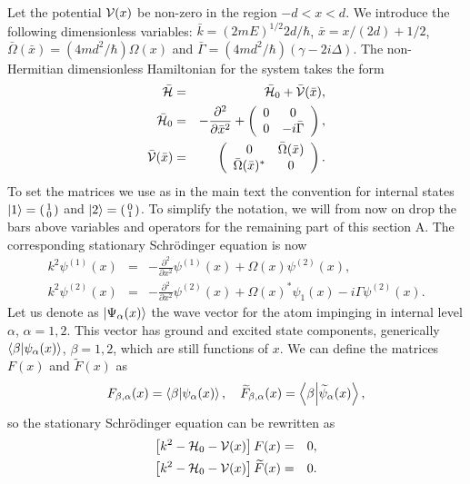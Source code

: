 %
Let the potential ${\cal V}(x)$ be non-zero in the region $-d < x < d$.
We  introduce the following dimensionless variables: $\bar k = (2mE)^{1/2}2d/\hbar$, $\bar x = x/(2d) + 1/2$,
$\bar\Omega (\bar x)= (4md^2/\hbar) \Omega(x)$ and $\bar\Gamma = (4md^2/\hbar) (\gamma-2i\Delta)$.
%
%
The non-Hermitian dimensionless Hamiltonian for the system takes the form
%
\begin{eqnarray}
	\bar {\cal H}&=& \bar {\cal H}_{0}+\bar {\cal V}(\bar x), \\
	\bar {\cal H}_{0}&=&- \frac{\partial^2 }{\partial {\bar x}^2}+\left(\begin{array}{cc}
	0 & 0 \\
	0 & -i\bar\Gamma
	\end{array}\right), \\
	\bar {\cal V}(\bar x)&=& \left(\begin{array}{cc}
	0 & \bar\Omega (\bar x)\\
	\bar\Omega (\bar x)^{*} & 0
	\end{array}\right).
\end{eqnarray}
%
To set the matrices we use as in the main text the convention for internal states $\ket{1} = \left(\begin{smallmatrix}1\\0\end{smallmatrix}\right)$ and $\ket{2} = \left(\begin{smallmatrix}0\\1\end{smallmatrix}\right)$.
%
To simplify the notation, we will from now on drop the bars above variables and operators for the remaining part of this section A.
The corresponding stationary Schr\"odinger equation is now
%
\begin{eqnarray}
	k^{2} \psi^{(1)}(x)&=&-\frac{\partial^2}{\partial x^2}\psi^{(1)}(x)+\Omega(x) \psi^{(2)}(x),
	\nonumber \\
	k^{2} \psi^{(2)}(x)&=&-\frac{\partial^2}{\partial x^2}\psi^{(2)}(x)+\Omega(x)^* \psi_{1}(x)-i \Gamma \psi^{(2)}(x).
	\nonumber
\end{eqnarray}
%
Let us denote as  $|{\Psi}_\alpha(x)\rangle$  the wave vector for the atom impinging in internal level $\alpha$, $\alpha=1,2$.
This vector has ground and excited state components, generically $\braket{\beta}{\psi_{\alpha}(x)}$, $\beta=1,2$, which are still functions of $x$.
We can define the matrices $F(x)$ and $\widetilde{F}(x)$ as
%
\begin{eqnarray}
	F_{\beta,\alpha} (x) = \braket{\beta}{\psi_{\alpha}(x)},
	\quad
	\widetilde{F}_{\beta,\alpha} (x) = \braket{\beta}{\widetilde{\psi}_{\alpha}(x)},
\end{eqnarray}
%
so the stationary Schr\"odinger equation can be rewritten as
%
\begin{eqnarray}
	\left[k^2-{\cal H}_{0}-{\cal V}(x)\right]F(x)&=&0,
	\nonumber\\
	\left[k^2-{\cal H}_{0}-{\cal V}(x)\right]\widetilde{F}(x)&=&0.
\end{eqnarray}
%

